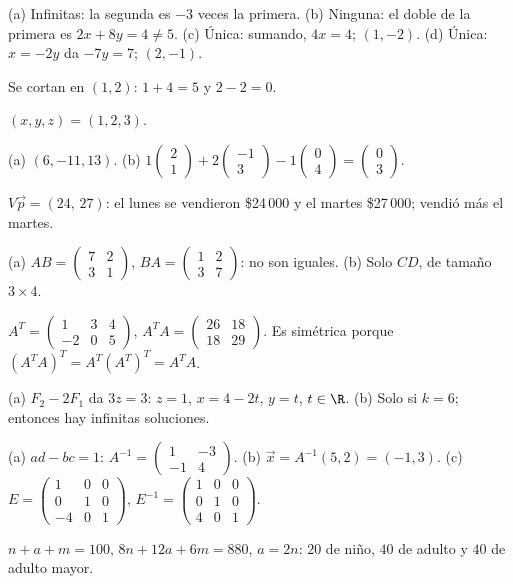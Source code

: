 \documentclass[11pt,a4paper]{article}
\newcommand{\sm}[1]{\left(\begin{smallmatrix}#1\end{smallmatrix}\right)}
\begin{document}
\respuestas
\begin{respuestascortas}
\begin{soluciones}
\item (a) Infinitas: la segunda es $-3$ veces la primera. (b) Ninguna: el doble de la primera es $2x+8y=4\neq5$.
  (c) Única: sumando, $4x=4$; $(1,-2)$. (d) Única: $x=-2y$ da $-7y=7$; $(2,-1)$.
\item Se cortan en $(1,2)$: $1+4=5$ y $2-2=0$.
\item $(x,y,z)=(1,2,3)$.
\item (a) $(6,-11,13)$. (b) $1\sm{2\\1}+2\sm{-1\\3}-1\sm{0\\4}=\sm{0\\3}$.
\item $V\vec p=(24,\,27)$: el lunes se vendieron \$24\,000 y el martes \$27\,000; vendió más el martes.
\item (a) $AB=\sm{7&2\\3&1}$, $BA=\sm{1&2\\3&7}$: no son iguales.
  (b) Solo $CD$, de tamaño $3\times4$.
\item $A^T=\sm{1&3&4\\-2&0&5}$, $A^TA=\sm{26&18\\18&29}$. Es simétrica porque
  $(A^TA)^T=A^T(A^T)^T=A^TA$.
\item (a) $F_2-2F_1$ da $3z=3$: $z=1$, $x=4-2t$, $y=t$, $t\in\R$.
  (b) Solo si $k=6$; entonces hay infinitas soluciones.
\item (a) $ad-bc=1$: $A^{-1}=\sm{1&-3\\-1&4}$. (b) $\vec x=A^{-1}(5,2)=(-1,3)$.
  (c) $E=\sm{1&0&0\\0&1&0\\-4&0&1}$, $E^{-1}=\sm{1&0&0\\0&1&0\\4&0&1}$.
\item $n+a+m=100$, $8n+12a+6m=880$, $a=2n$: $20$ de niño, $40$ de adulto y $40$ de adulto mayor.
\end{soluciones}
\end{respuestascortas}
\end{document}
